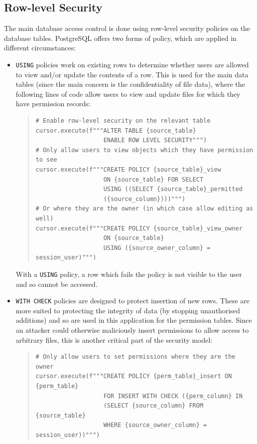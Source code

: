 \documentclass[12pt]{report}
\begin{document}
\subsection{Row-level Security}
The main database access control is done using row-level security policies on the database tables. PostgreSQL offers two forms of policy, which are applied in different circumstances\cite{postgres-policy}:
\begin{itemize}
\item
  \texttt{USING} policies work on existing rows to determine whether users are allowed to view and/or update the contents of a row. This is used for the main data tables (since the main concern is the confidentiality of file data), where the following lines of code allow users to view and update files for which they have permission records:

\begin{quote}
\begin{samepage}
\begin{verbatim}
# Enable row-level security on the relevant table
cursor.execute(f"""ALTER TABLE {source_table}
                   ENABLE ROW LEVEL SECURITY""")
# Only allow users to view objects which they have permission to see
cursor.execute(f"""CREATE POLICY {source_table}_view
                   ON {source_table} FOR SELECT
                   USING ((SELECT {source_table}_permitted
                   ({source_column})))""")
# Or where they are the owner (in which case allow editing as well)
cursor.execute(f"""CREATE POLICY {source_table}_view_owner
                   ON {source_table}
                   USING ({source_owner_column} = session_user)""")
\end{verbatim}
\end{samepage}
\end{quote}

  With a \texttt{USING} policy, a row which fails the policy is not visible to the user and so cannot be accessed.

\item
  \texttt{WITH CHECK} policies are designed to protect insertion of new rows. These are more suited to protecting the integrity of data (by stopping unauthorised additions) and so are used in this application for the permission tables. Since an attacker could otherwise maliciously insert permissions to allow access to arbitrary files, this is another critical part of the security model:

\begin{quote}
\begin{samepage}
\begin{verbatim}
# Only allow users to set permissions where they are the owner
cursor.execute(f"""CREATE POLICY {perm_table}_insert ON {perm_table}
                   FOR INSERT WITH CHECK ({perm_column} IN
                   (SELECT {source_column} FROM {source_table}
                   WHERE {source_owner_column} = session_user))""")
\end{verbatim}
\end{samepage}
\end{quote}
\end{itemize}
\end{document}

